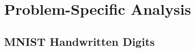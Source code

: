 \section{Problem-Specific Analysis} \label{sec:Problem-Specific Analysis}

\subsection{MNIST Handwritten Digits}